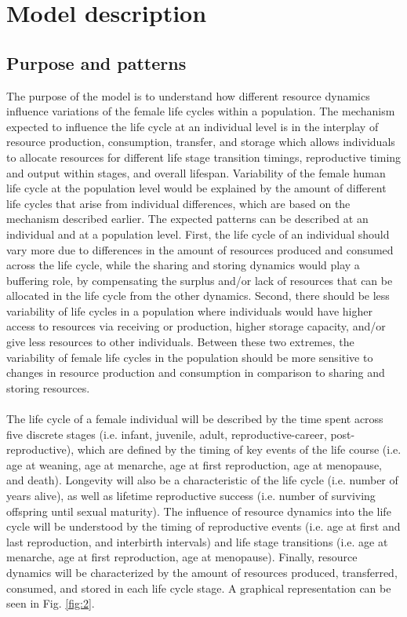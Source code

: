 \documentclass{article}
\begin{document}
\section{Model description}

\subsection{Purpose and patterns}

The purpose of the model is to understand how different resource dynamics influence variations of the female life cycles within a population. The mechanism expected to influence the life cycle at an individual level is in the interplay of resource production, consumption, transfer, and storage which allows individuals to allocate resources for different life stage transition timings, reproductive timing and output within stages, and overall lifespan. Variability of the female human life cycle at the population level would be explained by the amount of different life cycles that arise from individual differences, which are based on the mechanism described earlier. The expected patterns can be described at an individual and at a population level. First, the life cycle of an individual should vary more due to differences in the amount of resources produced and consumed across the life cycle, while the sharing and storing dynamics would play a buffering role, by compensating the surplus and/or lack of resources that can be allocated in the life cycle from the other dynamics. Second, there should be less variability of life cycles in a population where individuals would have higher access to resources via receiving or production, higher storage capacity, and/or give less resources to other individuals. Between these two extremes, the variability of female life cycles in the population should be more sensitive to changes in resource production and consumption in comparison to sharing and storing resources.
\\\\
The life cycle of a female individual will be described by the time spent across five discrete stages (i.e. infant, juvenile, adult, reproductive-career, post-reproductive), which are defined by the timing of key events of the life course (i.e. age at weaning, age at menarche, age at first reproduction, age at menopause, and death). Longevity will also be a characteristic of the life cycle (i.e. number of years alive), as well as lifetime reproductive success (i.e. number of surviving offspring until sexual maturity). The influence of resource dynamics into the life cycle will be understood by the timing of reproductive events (i.e. age at first and last reproduction, and interbirth intervals) and life stage transitions (i.e. age at menarche, age at first reproduction, age at menopause). Finally, resource dynamics will be characterized by the amount of resources produced, transferred, consumed, and stored in each life cycle stage. A graphical representation can be seen in Fig. \ref{fig:2}.
\end{document}
